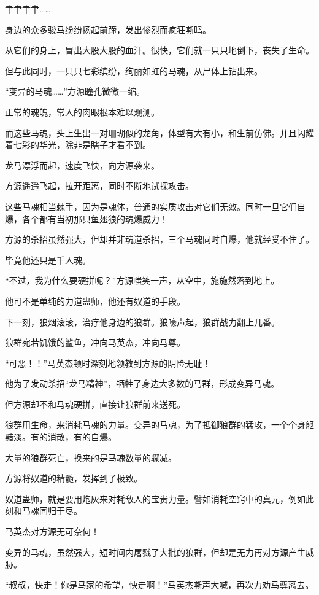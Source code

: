 \begin{this_body}
聿聿聿聿……

身边的众多骏马纷纷扬起前蹄，发出惨烈而疯狂嘶鸣。

从它们的身上，冒出大股大股的血汗。很快，它们就一只只地倒下，丧失了生命。

但与此同时，一只只七彩缤纷，绚丽如虹的马魂，从尸体上钻出来。

“变异的马魂……”方源瞳孔微微一缩。

正常的魂魄，常人的肉眼根本难以观测。

而这些马魂，头上生出一对珊瑚似的龙角，体型有大有小，和生前仿佛。并且闪耀着七彩的华光，除非是瞎子才看不到。

龙马漂浮而起，速度飞快，向方源袭来。

方源遥遥飞起，拉开距离，同时不断地试探攻击。

这些马魂相当棘手，因为是魂体，普通的实质攻击对它们无效。同时一旦它们自爆，各个都有当初那只鱼翅狼的魂爆威力！

方源的杀招虽然强大，但却并非魂道杀招，三个马魂同时自爆，他就经受不住了。

毕竟他还只是千人魂。

“不过，我为什么要硬拼呢？”方源嗤笑一声，从空中，施施然落到地上。

他可不是单纯的力道蛊师，他还有奴道的手段。

下一刻，狼烟滚滚，治疗他身边的狼群。狼嚎声起，狼群战力翻上几番。

狼群宛若饥饿的鲨鱼，冲向马英杰，冲向马尊。

“可恶！！”马英杰顿时深刻地领教到方源的阴险无耻！

他为了发动杀招“龙马精神”，牺牲了身边大多数的马群，形成变异马魂。

但方源却不和马魂硬拼，直接让狼群前来送死。

狼群用生命，来消耗马魂的力量。变异的马魂，为了抵御狼群的猛攻，一个个身躯黯淡。有的消散，有的自爆。

大量的狼群死亡，换来的是马魂数量的骤减。

方源将奴道的精髓，发挥到了极致。

奴道蛊师，就是要用炮灰来对耗敌人的宝贵力量。譬如消耗空窍中的真元，例如此刻和马魂同归于尽。

马英杰对方源无可奈何！

变异的马魂，虽然强大，短时间内屠戮了大批的狼群，但却是无力再对方源产生威胁。

“叔叔，快走！你是马家的希望，快走啊！”马英杰嘶声大喊，再次力劝马尊离去。


\end{this_body}
